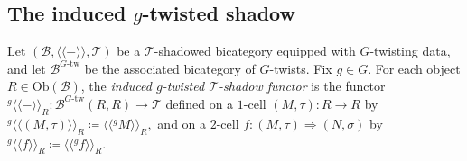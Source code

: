 \documentclass[11pt,oneside]{amsart}
\numberwithin{equation}{section}
\numberwithin{figure}{section}
\theoremstyle{plain}
\theoremstyle{definition}
\theoremstyle{remark}
\begin{document}
\subsection{The induced $g$-twisted shadow}
\begin{definition}\label{def:g-twisted-shadow}
Let $(\mathcal B,\langle\!\langle-\rangle\!\rangle,\mathcal T)$ be a $\mathcal T$-shadowed bicategory equipped with $G$-twisting data, and let $\mathcal B^{G\text{-tw}}$ be the associated bicategory of $G$-twists. Fix $g\in G$. For each object $R\in \mathrm{Ob}(\mathcal B)$, the \emph{induced $g$-twisted $\mathcal T$-shadow functor} is the functor
\(
{}^g\!\langle\!\langle-\rangle\!\rangle_R:\mathcal B^{G\text{-tw}}(R,R)\to \mathcal T
\)
defined on a $1$-cell $(M,\tau):R\to R$ by
\(
{}^g\!\langle\!\langle (M,\tau)\rangle\!\rangle_R
\coloneqq
\langle\!\langle {}^g M\rangle\!\rangle_R,
\)
and on a $2$-cell $f:(M,\tau)\Rightarrow (N,\sigma)$ by
\(
{}^g\!\langle\!\langle f\rangle\!\rangle_R
\coloneqq
\langle\!\langle {}^g f\rangle\!\rangle_R.
\)
\end{definition}
\end{document}

